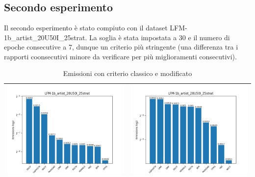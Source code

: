 \subsection{Secondo esperimento}
Il secondo esperimento è stato compiuto con il dataset LFM-1b\_artist\_20U50I\_25strat. La soglia è stata impostata a 30 e il numero di epoche consecutive a 7, dunque un criterio più stringente (una differenza tra i rapporti coonsecutivi minore da verificare per più miglioramenti consecutivi).


\begin{table}[H]
    \centering
    \footnotesize
    \setlength\tabcolsep{0pt}
    \begin{tabularx}{\textwidth}{|X|X|}
        \hline
        \includegraphics[width=\linewidth, trim=0 0 0 0]{images/emissions_LFM-1b_artist_20U50I_25strat_earlyClassic.png} &
        \includegraphics[width=\linewidth, trim=0 0 0 0]{images/emissions_LFM-1b_artist_20U50I_25strat_earlyModified.png} \\
        \hline
    \end{tabularx}
    \caption{Emissioni con criterio classico e modificato}
    \label{tab:emissions_info}
\end{table}



